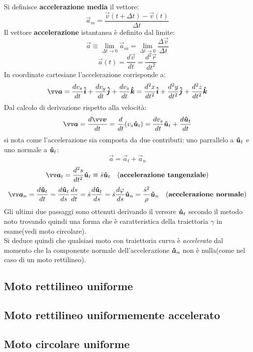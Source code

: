 Si definisce \textbf{accelerazione media} il vettore:
\[
    \vec{a}_m = \frac{\vec{v}(t + \Delta t)-\vec{v}(t)}{\Delta t}      
\]
Il vettore \textbf{accelerazione} istantanea è definito dal limite:
\[
    \vec{a} \equiv \lim_{\Delta t \to 0} \vec{a}_m = \lim_{\Delta t \to 0} \frac{\Delta \vec{v}}{\Delta t}      
\]
\[
 \vec{a}(t) = \frac{d \vec{v}}{dt} = \frac{d^2\vec{r}}{dt^2}    
\]
In coordinate cartesiane l'accelerazione corrisponde a:
\[
    \vec{a} =  \frac{dv_x}{dt} \v{i} + \frac{dv_y}{dt} \v{j} + \frac{dv_z}{dt} \v{k}
    = \frac{d^2x}{dt^2} \v{i} + \frac{d^2y}{dt^2} \v{j} + \frac{d^2z}{dt^2} \v{k}
\]
Dal calcolo di derivazione rispetto alla velocità:
\[
    \vec{a} = \frac{d \vec{v}}{dt} = \frac{d}{dt} (v_s \v{u}_t) = \frac{dv_s}{dt}\v{u}_t
    + \frac{d\v{u}_t}{dt}
\]
si nota come l'accelerazione sia composta da due contributi: uno parrallelo a $\boldsymbol{\hat{u}}_t$ e uno normale a 
$\boldsymbol{\hat{u}}_t$:
\[
 \vec{a} = \vec{a}_t + \vec{a}_n   
\]
\[
 \vec{a}_t = \frac{d^2 s}{dt^2} \v{u}_t \equiv \ddot{s} \v{u}_t \quad (\textbf{accelerazione tangenziale})
\]
\[
    \vec{a}_n = \frac{d\v{u}_t}{dt} = \frac{d\v{u}_t}{ds} \frac{ds}{dt} = \dot{s}\frac{d\v{u}_t}{ds}
    = \dot{s}\frac{d \varphi}{ds}\v{u}_n = \frac{\dot{s}^2}{\rho}\v{u}_n \quad (\textbf{accelerazione normale})    
\]
Gli ultimi due passaggi sono ottenuti derivando il versore $\boldsymbol{\hat{u}}_t$ secondo il metodo noto trovando quindi una
forma che è caratteristica della traiettoria $\gamma$ in esame(vedi moto circolare). \\
Si deduce quindi che qualsiasi moto con traiettoria curva è \emph{accelerato} dal momento che la componente normale
dell'accelerazione $\boldsymbol{\hat{a}}_n$ non è nulla(come nel caso di un moto rettilineo).






\subsection*{Moto rettilineo uniforme}
\subsection*{Moto rettilineo uniformemente accelerato}
\subsection*{Moto circolare uniforme}
\label{cinem: circ-unif}